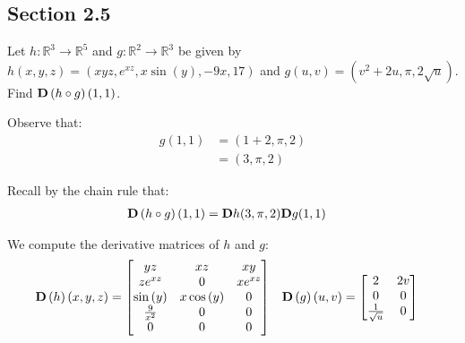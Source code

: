 \subsection{Section 2.5}

\begin{tcolorbox}[
        title={Problem 12},
        valign=center,
        nobeforeafter,
        colframe=gray!95!black
    ]
Let \(h: \mathbb{R}^3 \rightarrow \mathbb{R}^5\) and \(g: \mathbb{R}^2 \rightarrow \mathbb{R}^3\) be given by
\(h(x, y, z) = \left(xyz, e^{xz}, x \sin(y), -9x , 17\right)\) and \(g(u, v) = \left(v^2 + 2u, \pi, 2\sqrt{u}\right)\). \\

Find \(\vb{D}\left(h \circ g\right)(1, 1)\).
\end{tcolorbox}

\begin{solution}
    Observe that:
    \begin{align}
        g(1, 1) &= \left(1 + 2, \pi, 2\right) \\
        &= (3, \pi, 2)
    \end{align}
    
    Recall by the chain rule that:
    \begin{align}
        \vb{D}\left(h \circ g\right)(1, 1) &= \vb{D}h(3, \pi, 2) \vb{D}g(1, 1)
    \end{align}
    
    We compute the derivative matrices of \(h\) and \(g\):
    \begin{align*}
        \vb{D}\left(h\right)(x, y, z) &=
        \begin{bmatrix}
            yz & xz & xy \\
            ze^{xz} & 0 & xe^{xz} \\
            \sin{(y)} & x\cos{(y)} & 0 \\
            \frac{9}{x^2} & 0 & 0 \\
            0 & 0 & 0
        \end{bmatrix} & \vb{D}\left(g\right)(u, v) &=
        \begin{bmatrix}
            2 & 2v \\
            0 & 0 \\
            \frac{1}{\sqrt{u}} & 0
        \end{bmatrix}
    \end{align*}
    

\end{solution}

